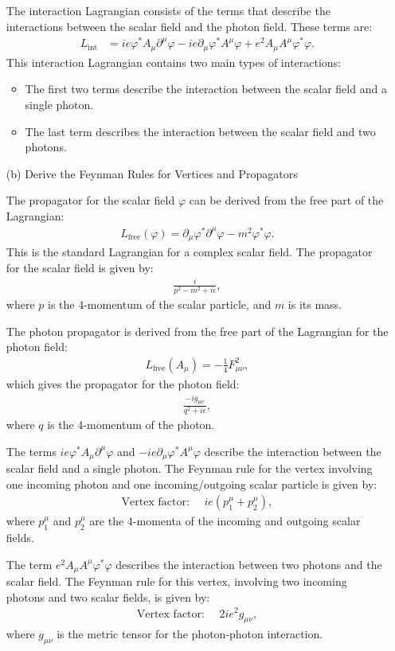 \begin{enumerate}
The interaction Lagrangian consists of the terms that describe the interactions between the scalar field and the photon field. These terms are:
\begin{align}
    L_{\text{int}} &= ie \varphi^* A_\mu \partial^\mu \varphi - ie \partial_\mu \varphi^* A^\mu \varphi + e^2 A_\mu A^\mu \varphi^* \varphi. 
\end{align}
This interaction Lagrangian contains two main types of interactions:
\begin{itemize}
    \item The first two terms describe the interaction between the scalar field and a single photon.
    \item The last term describes the interaction between the scalar field and two photons.
\end{itemize}
\item [(b)] Derive the Feynman Rules for Vertices and Propagators

The propagator for the scalar field $\varphi$ can be derived from the free part of the Lagrangian:
\begin{align}
    L_{\text{free}}(\varphi) = \partial_\mu \varphi^* \partial^\mu \varphi - m^2 \varphi^* \varphi.
\end{align}
This is the standard Lagrangian for a complex scalar field. The propagator for the scalar field is given by:
\begin{align}
    \frac{i}{p^2 - m^2 + i\epsilon},
\end{align}
where $p$ is the 4-momentum of the scalar particle, and $m$ is its mass.

The photon propagator is derived from the free part of the Lagrangian for the photon field:
\begin{align}
    L_{\text{free}}(A_\mu) = -\frac{1}{4} F_{\mu\nu}^2,
\end{align}
which gives the propagator for the photon field:
\begin{align}
    \frac{-ig_{\mu\nu}}{q^2 + i\epsilon},
\end{align}
where $q$ is the 4-momentum of the photon.

The terms $ie \varphi^* A_\mu \partial^\mu \varphi$ and $-ie \partial_\mu \varphi^* A^\mu \varphi$ describe the interaction between the scalar field and a single photon. The Feynman rule for the vertex involving one incoming photon and one incoming/outgoing scalar particle is given by:
\begin{align}
    \text{Vertex factor: } \quad ie (p_1^\mu + p_2^\mu), 
\end{align}
where $p_1^\mu$ and $p_2^\mu$ are the 4-momenta of the incoming and outgoing scalar fields.

The term $e^2 A_\mu A^\mu \varphi^* \varphi$ describes the interaction between two photons and the scalar field. The Feynman rule for this vertex, involving two incoming photons and two scalar fields, is given by:
\begin{align}
    \text{Vertex factor: } \quad 2ie^2 g_{\mu\nu},
\end{align}
where $g_{\mu\nu}$ is the metric tensor for the photon-photon interaction.
\end{enumerate}